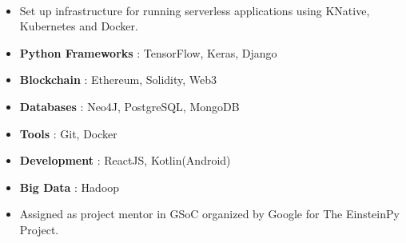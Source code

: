 \documentclass[10pt,a4paper,ragged2e]{altacv}
\begin{document}
\divider
\\
\begin{itemize}
\item Set up infrastructure for running serverless applications using KNative, Kubernetes and Docker.
\end{itemize}





\begin{itemize}
\item \textbf{Python Frameworks} : TensorFlow, Keras, Django
\item \textbf{Blockchain} : Ethereum, Solidity, Web3
\item \textbf{Databases} : Neo4J, PostgreSQL, MongoDB
\item \textbf{Tools} : Git, Docker
\item \textbf{Development} : ReactJS, Kotlin(Android)
\item \textbf{Big Data} : Hadoop
\end{itemize}




\begin{itemize}
\item Assigned as project mentor in GSoC organized by Google for The EinsteinPy Project.
\end{itemize}



\end{document}
